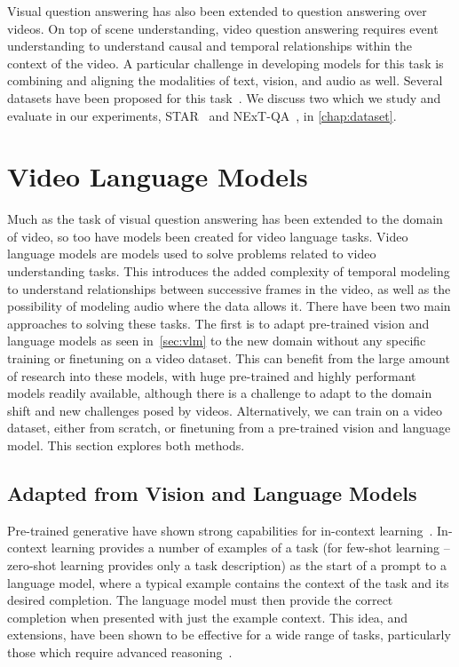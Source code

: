 Visual question answering has also been extended to question answering over
videos. On top of scene understanding, video question answering requires event
understanding to understand causal and temporal relationships within the
context of the video. A particular challenge in developing models for this task
is combining and aligning the modalities of text, vision, and audio as well.
Several datasets have been proposed for this
task~\citep{xu2016msr-vtt,wu2021star,xiao2021nextqa,lei2020tvqaplus}. We
discuss two which we study and evaluate in our experiments,
STAR~\citep{wu2021star} and NExT-QA~\citep{xiao2021nextqa}, in
\cref{chap:dataset}.

\section{Video Language Models}
\label{sec:vidlma}

Much as the task of visual question answering has been extended to the domain
of video, so too have models been created for video language tasks. Video
language models are models used to solve problems related to video
understanding tasks. This introduces the added complexity of temporal modeling
to understand relationships between successive frames in the video, as well as
the possibility of modeling audio where the data allows it. There have been two
main approaches to solving these tasks. The first is to adapt pre-trained vision
and language models as seen in~\cref{sec:vlm} to the new domain without any specific
training or finetuning on a video dataset. This can benefit from the large
amount of research into these models, with huge pre-trained and highly
performant models readily available, although there is a challenge to adapt to
the domain shift and new challenges posed by videos. Alternatively, we can
train on a video dataset, either from scratch, or finetuning from a pre-trained
vision and language model. This section explores both methods.

\subsection{Adapted from Vision and Language Models}
\label{ssec:adaptvlm}

Pre-trained generative  have shown strong capabilities for
in-context learning~\citep{brown2020gpt3}. In-context learning provides a
number of examples of a task (for few-shot learning -- zero-shot learning
provides only a task description) as the start of a prompt to a language model,
where a typical example contains the context of the task and its desired
completion.  The language model must then provide the correct completion when
presented with just the example context. This idea, and extensions, have been
shown to be effective for a wide range of tasks, particularly those which
require advanced reasoning~\citep{wei2022cot,kojima2022step}.

